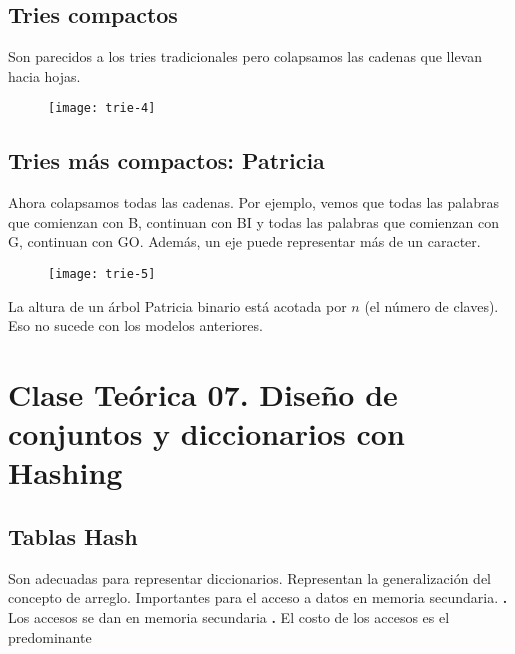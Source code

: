 \documentclass[10pt,a4paper]{article}
\begin{document}
\subsection{Tries compactos}

Son parecidos a los tries tradicionales pero colapsamos las cadenas que llevan hacia hojas.

\begin{figure}[h]
	\centering
\texttt{[image: trie-4]}
	\label{drivers1}
\end{figure}
\newpage

\subsection{Tries más compactos: Patricia}

Ahora colapsamos todas las cadenas. Por ejemplo, vemos que todas las palabras que comienzan con B, continuan con BI y todas las palabras que comienzan con G, continuan con GO. 
\newline
\newline
Además, un eje puede representar más de un caracter.

\begin{figure}[h]
	\centering
\texttt{[image: trie-5]}
	\label{drivers1}
\end{figure}

La altura de un árbol Patricia binario está acotada por $n$ (el número de claves). Eso no sucede con los modelos anteriores. 
\newpage

\section{Clase Teórica 07. Diseño de conjuntos y diccionarios con Hashing}

\subsection{Tablas Hash}

Son adecuadas para representar diccionarios.
\newline
\newline
Representan la generalización del concepto de arreglo.
\newline
\newline
Importantes para el acceso a datos en memoria secundaria.
\newline
\newline
\textbf{.} Los accesos se dan en memoria secundaria
\newline
\newline
\textbf{.} El costo de los accesos es el predominante
\end{document}
